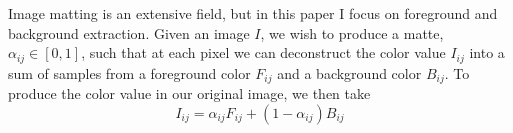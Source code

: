 Image matting is an extensive field, but in this paper I focus on foreground and background extraction. Given an image $I$, we wish to produce a matte, $\alpha_{ij}\in[0,1]$, such that at each pixel we can deconstruct the color value $I_{ij}$ into a sum of samples from a foreground color $F_{ij}$ and a background color $B_{ij}$. To produce the color value in our original image, we then take
\[I_{ij}=\alpha_{ij}F_{ij}+(1-\alpha_{ij})B_{ij}\]